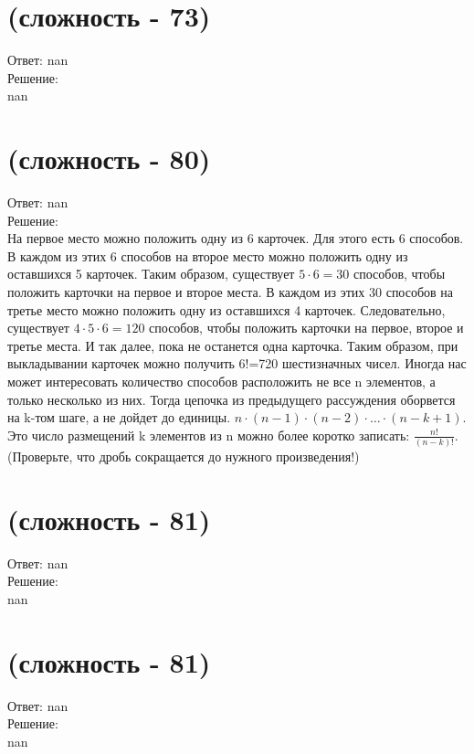 \documentclass[a4paper,11pt]{article}%
\begin{document}
%
\section{(сложность {-} 73)}%
\label{sec:( {-} 73)}%
\hspace{3ex} Ответ: nan \\%
%
\hspace*{3ex} Решение: \\%
nan

%
\section{(сложность {-} 80)}%
\label{sec:( {-} 80)}%
\hspace{3ex} Ответ: nan \\%
%
\hspace*{3ex} Решение: \\%
На первое место можно положить одну из 6 карточек. Для этого есть
6 способов. В каждом из этих 6 способов на второе место можно положить одну
из оставшихся 5 карточек. Таким образом, существует $5 \cdot 6=30$ способов, чтобы
положить карточки на первое и второе места. В каждом из этих 30 способов на
третье место можно положить одну из оставшихся 4 карточек. Следовательно,
существует $4 \cdot 5 \cdot 6=120$ способов, чтобы положить карточки на первое, второе
и третье места. И так далее, пока не останется одна карточка. Таким образом,
при выкладывании карточек можно получить 6!=720 шестизначных чисел. Иногда нас может интересовать количество способов расположить не все n
элементов, а только несколько из них. Тогда цепочка из предыдущего
рассуждения оборвется на k-том шаге, а не дойдет до единицы. $n \cdot(n-1) \cdot(n-2) \cdot \ldots \cdot(n-k+1)$. Это число размещений k элементов из n можно более коротко записать: $\frac{n !}{(n-k) !}$. (Проверьте, что дробь сокращается до нужного произведения!)

%
\section{(сложность {-} 81)}%
\label{sec:( {-} 81)}%
\hspace{3ex} Ответ: nan \\%
%
\hspace*{3ex} Решение: \\%
nan

%
\section{(сложность {-} 81)}%
\label{sec:( {-} 81)}%
\hspace{3ex} Ответ: nan \\%
%
\hspace*{3ex} Решение: \\%
nan

%
\end{document}
